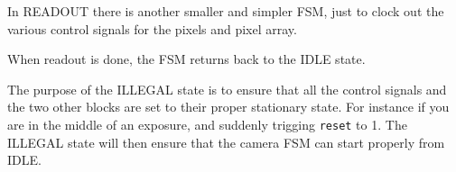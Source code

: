 In READOUT there is another smaller and simpler FSM, just to clock out the various control signals for the pixels and pixel array. 

When readout is done, the FSM returns back to the IDLE state.

The purpose of the ILLEGAL state is to ensure that all the control signals and the two other blocks are set to their proper stationary state. 
For instance if you are in the middle of an exposure, and suddenly trigging \texttt{reset} to 1. 
The ILLEGAL state will then ensure that the camera FSM can start properly from IDLE.


